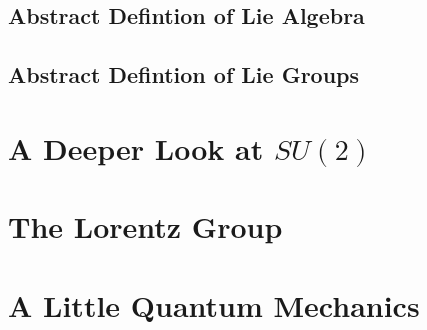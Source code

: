 \documentclass[]{article}
\begin{document}
\subsection{Abstract Defintion of Lie Algebra}
\subsection{Abstract Defintion of Lie Groups}

\section{A Deeper Look at $SU(2)$}
\section{The Lorentz Group}
\section{A Little Quantum Mechanics}






\end{document}
